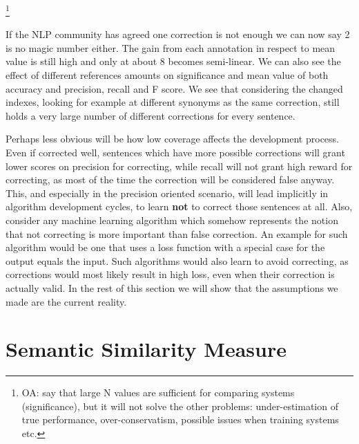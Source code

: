 \documentclass[letter,11pt]{article}
\newcommand{\oa}[1]{\footnote{\color{red}OA: #1}}
\begin{document}
\oa{say that large N values are sufficient for comparing systems (significance),
  but it will not solve the other problems: under-estimation of true performance,
  over-conservatism, possible issues when training systems etc.}

If the NLP community has agreed one correction is not enough\cite{tetreault2008native}
we can now say 2 is no magic number either. The gain from each annotation in respect to mean value is still high and only at about 8 becomes semi-linear. We can also see the effect of different references amounts on significance and mean value of both accuracy and precision, recall and F score.
We see that considering the changed indexes, looking for example at different synonyms as the same correction, still holds a very large number of different corrections for every sentence.

Perhaps less obvious will be how low coverage affects the development
process. Even if corrected well, sentences which have more possible
corrections will grant lower scores on precision for correcting, while recall will not grant high reward for correcting, as most of the time the correction will be considered false anyway. This, and especially in the precision oriented scenario, will lead implicitly in algorithm development cycles, to learn \textbf{not} to correct those sentences at all. Also, consider any machine learning algorithm which somehow represents the notion that not correcting is more important than false correction. An example for such algorithm would be one that uses a loss function with a special case for the output equals the input. Such algorithms would also learn to avoid correcting, as corrections would most likely result in high loss, even when their correction is actually valid.
In the rest of this section we will show that the assumptions we made are the current reality. 


\section{Semantic Similarity Measure}\label{sec:Semantics}


\end{document}
